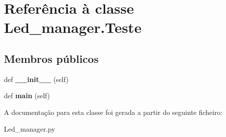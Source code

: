 \hypertarget{class_led__manager_1_1_teste}{}\section{Referência à classe Led\+\_\+manager.\+Teste}
\label{class_led__manager_1_1_teste}
\subsection*{Membros públicos}
\begin{DoxyCompactItemize}
\item 
def {\bfseries \+\_\+\+\_\+init\+\_\+\+\_\+} (self)\hypertarget{class_led__manager_1_1_teste_a9494f27b349235593745eff4a18c6e72}{}\label{class_led__manager_1_1_teste_a9494f27b349235593745eff4a18c6e72}

\item 
def {\bfseries main} (self)\hypertarget{class_led__manager_1_1_teste_ac5921ba5e34dadb5ab33be22bf56b3d0}{}\label{class_led__manager_1_1_teste_ac5921ba5e34dadb5ab33be22bf56b3d0}

\end{DoxyCompactItemize}


A documentação para esta classe foi gerada a partir do seguinte ficheiro\+:\begin{DoxyCompactItemize}
\item 
Led\+\_\+manager.\+py\end{DoxyCompactItemize}
